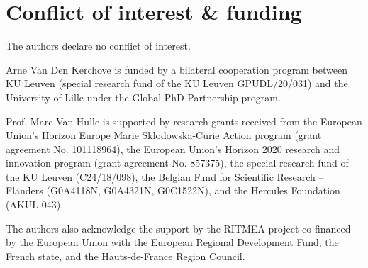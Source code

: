 \chapter*{Conflict of interest \& funding}
The authors declare no conflict of interest.

Arne Van Den Kerchove is funded by a bilateral cooperation program between KU
Leuven (special research fund of the KU Leuven GPUDL/20/031) and the University
of Lille under the Global PhD Partnership program.

Prof. Marc Van Hulle is supported by research grants received from
the European Union’s Horizon Europe Marie Sklodowska-Curie Action program
(grant agreement No. 101118964), the European Union’s Horizon 2020 research and
innovation program (grant agreement No. 857375), the special research fund of
the KU Leuven (C24/18/098), the Belgian Fund for Scientific Research – Flanders
(G0A4118N, G0A4321N, G0C1522N), and the Hercules
Foundation (AKUL 043).

The authors also acknowledge the support by the RITMEA project co-financed by the
European Union with the European Regional Development Fund, the French state,
and the Hauts-de-France Region Council.
